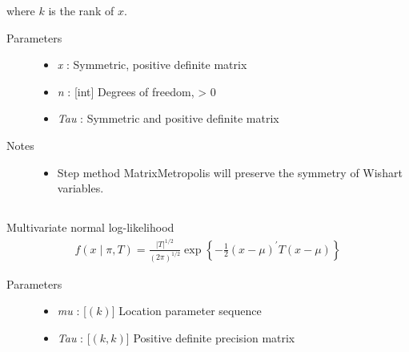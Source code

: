 \documentclass[]{jss}
\begin{document}
where $k$ is the rank of $x$.
\begin{description}
\item[Parameters] \leavevmode\begin{itemize}
\item {} 
\emph{x} : Symmetric, positive definite matrix

\item {} 
\emph{n} : {[}int{]} Degrees of freedom, \textgreater{} 0

\item {} 
\emph{Tau} : Symmetric and positive definite matrix

\end{itemize}

\item[Notes]\leavevmode
\begin{itemize}
    \item {}
    Step method MatrixMetropolis will preserve the symmetry of Wishart variables.
\end{itemize}

\end{description}


\subsection[multivariate normal]{}

Multivariate normal log-likelihood
\begin{eqnarray*}
f(x \mid \pi, T) = \frac{|T|^{1/2}}{(2\pi)^{1/2}} \exp\left\{ -\frac{1}{2} (x-\mu)^{\prime}T(x-\mu) \right\}    
\end{eqnarray*}

\begin{description}
\item[Parameters] \leavevmode\begin{itemize}

\item {} 
\emph{mu} : [$(k)$] Location parameter sequence

\item {} 
\emph{Tau} : [$(k,k)$] Positive definite precision matrix

\end{itemize}

\end{description}


\subsection[multivariate normal, Cholesky parameterization]{ }
\end{document}
